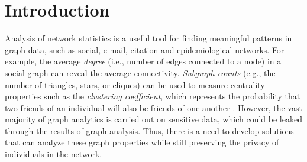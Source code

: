 \section{Introduction}
\label{chap1-sec:intro}


Analysis of network statistics is a useful tool for finding meaningful patterns in graph data, such as social, e-mail,  citation and epidemiological networks. 
For example, the average \textit{degree} (i.e., number of edges connected to a node) in a social graph can reveal the average connectivity. 
\textit{Subgraph counts} 
(e.g., the number of triangles, stars, or cliques) can be used to measure 
centrality properties such as the \textit{clustering coefficient}, 
which represents the probability that two friends of an individual will also be friends of one another \cite{Newman_PRL09}. 
However, the vast majority of graph analytics is carried out on sensitive data, which could be leaked through the results of graph analysis. Thus, there is a need to develop solutions that can analyze these graph properties while still preserving the privacy of 
individuals 
in the network.


